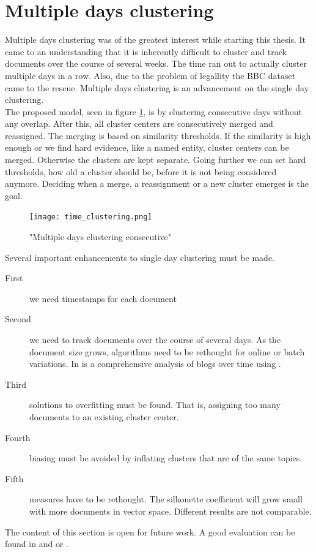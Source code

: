 \section{Multiple days clustering}
  Multiple days clustering was of the greatest interest while starting this thesis. It came to an understanding that it is inherently difficult to cluster and track documents over the course of several weeks. The time ran out to actually cluster multiple days in a row. Also, due to the problem of legallity the BBC dataset came to the rescue. Multiple days clustering is an advancement on the single day clustering.\\ 

  The proposed model, seen in figure \ref{time_clustering}, is by clustering consecutive days without any overlap. After this, all cluster centers are consecutively merged and reassigned. The merging is based on similarity thresholds. If the similarity is high enough or we find hard evidence, like a named entity, cluster centers can be merged. Otherwise the clusters are kept separate. Going further we can set hard thresholds, how old a cluster should be, before it is not being considered anymore. Deciding when a merge, a reassignment or a new cluster emerges is the goal.

    \begin{figure}[h!]
      \centering
        \texttt{[image: time\_clustering.png]}
        \caption{"Multiple days clustering consecutive"}
        \label{time_clustering}
    \end{figure} 

  Several important enhancements to single day clustering must be made.

  \begin{description}
    \item[First] we need timestamps for each document
    \item[Second] we need to track documents over the course of several days. As the document size grows, algorithms need to be rethought for online or batch variations. In \cite{BlogTopicLDA2013} is a comprehensive analysis of blogs over time using \lda{}.
    \item[Third] solutions to overfitting must be found. That is, assigning too many documents to an existing cluster center.
    \item[Fourth] biasing must be avoided by inflating clusters that are of the same topics.
    \item[Fifth] measures have to be rethought. The silhouette coefficient will grow small with more documents in vector space. Different results are not comparable.
  \end{description}

  The content of this section is open for future work. A good evaluation can be found in \cite{RecentTechniquesClusteringSurvey2012} and \cite{ClusteringTimesSeriesSurves2005} or \cite{IncrementalClustering2012}.




